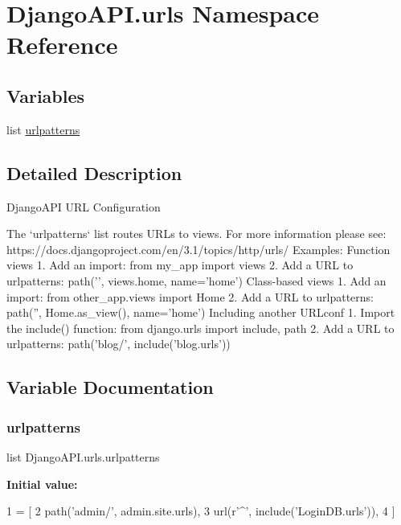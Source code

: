 \hypertarget{namespace_django_a_p_i_1_1urls}{}\section{Django\+A\+P\+I.\+urls Namespace Reference}
\label{namespace_django_a_p_i_1_1urls}
\subsection*{Variables}
\begin{DoxyCompactItemize}
\item 
list \hyperlink{namespace_django_a_p_i_1_1urls_a6f091bad65b9ee4612d82edd49191354}{urlpatterns}
\end{DoxyCompactItemize}


\subsection{Detailed Description}
\begin{DoxyVerb}DjangoAPI URL Configuration

The `urlpatterns` list routes URLs to views. For more information please see:
    https://docs.djangoproject.com/en/3.1/topics/http/urls/
Examples:
Function views
    1. Add an import:  from my_app import views
    2. Add a URL to urlpatterns:  path('', views.home, name='home')
Class-based views
    1. Add an import:  from other_app.views import Home
    2. Add a URL to urlpatterns:  path('', Home.as_view(), name='home')
Including another URLconf
    1. Import the include() function: from django.urls import include, path
    2. Add a URL to urlpatterns:  path('blog/', include('blog.urls'))
\end{DoxyVerb}
 

\subsection{Variable Documentation}
\mbox{\label{namespace_django_a_p_i_1_1urls_a6f091bad65b9ee4612d82edd49191354}} 
\subsubsection{\texorpdfstring{urlpatterns}{urlpatterns}}
{\footnotesize\ttfamily list Django\+A\+P\+I.\+urls.\+urlpatterns}

{\bfseries Initial value\+:}
\begin{DoxyCode}
1 =  [
2     path(\textcolor{stringliteral}{'admin/'}, admin.site.urls),
3     url(\textcolor{stringliteral}{r'^'}, include(\textcolor{stringliteral}{'LoginDB.urls'})),
4 ]
\end{DoxyCode}
